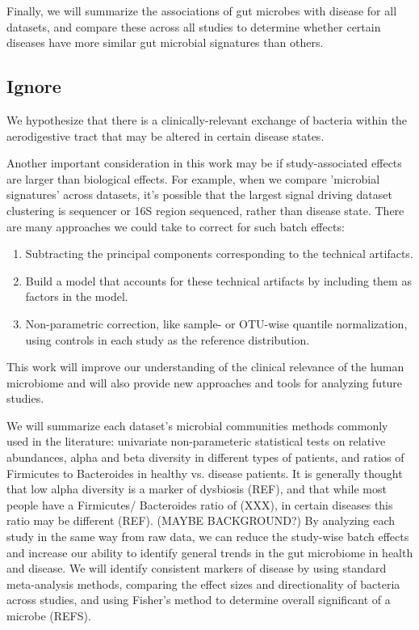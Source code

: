
Finally, we will summarize the associations of gut microbes with disease
for all datasets, and compare these across all studies to determine whether certain diseases have 
more similar gut microbial signatures than others.


\subsection{Ignore}
We hypothesize that there is a clinically-relevant exchange of bacteria within the aerodigestive tract that may be altered in certain disease states. 


Another important consideration in this work may be if study-associated effects are larger than biological effects. For example, when we compare 'microbial signatures' across datasets, it's possible that the largest signal driving dataset clustering is sequencer or 16S region sequenced, rather than disease state. There are many approaches we could take to correct for such batch effects:
\begin{enumerate}
	\item Subtracting the principal components corresponding to the technical artifacts.
	\item Build a model that accounts for these technical artifacts by including them as factors in the model.
	\item Non-parametric correction, like sample- or OTU-wise quantile normalization, using controls in each study as the reference distribution.
\end{enumerate}

This work will improve our 
understanding of the clinical relevance of the human microbiome and 
will also provide new approaches and tools for analyzing future 
studies.

We will summarize each dataset's microbial communities
methods commonly used in the 
literature: univariate non-parameteric statistical tests on relative 
abundances, alpha and beta diversity in different types of patients, 
and ratios of Firmicutes to Bacteroides in healthy vs. disease 
patients. It is generally thought that low alpha diversity is a marker 
of dysbiosis (REF), and that while most people have a Firmicutes/
Bacteroides ratio of (XXX), in certain diseases this ratio may be 
different (REF). (MAYBE BACKGROUND?) By analyzing each study in the 
same way from raw data, we can reduce the study-wise batch effects and 
increase our ability to identify general trends in the gut microbiome 
in health and disease. We will identify consistent markers of disease 
by using standard meta-analysis methods, comparing the effect sizes 
and directionality of bacteria across studies, and using Fisher's 
method to determine overall significant of a microbe (REFS). 

